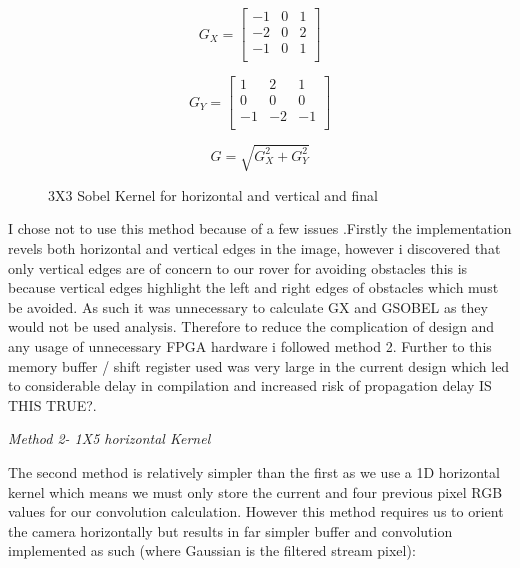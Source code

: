 \documentclass[10pt,twoside]{article}
\begin{document}
\begin{figure}[hbt]
    \begin{minipage}{.33\textwidth}
    \begin{equation}
    G_{X} =
        \begin{bmatrix}
        -1 & 0 & 1 \\ 
        -2 & 0 & 2 \\
        -1 & 0 & 1 \\
    \end{bmatrix}
    \end{equation}
    \end{minipage}
    \begin{minipage}{.33\textwidth}
    \begin{equation}
         G_{Y} =
        \begin{bmatrix}
        1 & 2 & 1 \\ 
        0 & 0 & 0 \\
        -1 & -2 & -1 \\
    \end{bmatrix}
    \end{equation}
    \end{minipage}
     \begin{minipage}{.33\textwidth}
    \begin{equation}
    G = \sqrt{G_{X}^2 + G_{Y}^2}
    \end{equation}
    \end{minipage}
    \caption{3X3 Sobel Kernel for horizontal and vertical and final}
\end{figure}

I chose not to use this method because of a few issues .Firstly the implementation revels both horizontal and vertical edges in the image, however i discovered that only vertical edges are of concern to our rover for avoiding obstacles this is because vertical edges highlight the left and right edges of obstacles which must be avoided. As such it was unnecessary to calculate GX and GSOBEL as they would not be used analysis. Therefore to reduce the complication of design and any usage of unnecessary FPGA hardware i followed method 2. Further to this memory buffer / shift register used was very large in the current design which led to considerable delay in compilation and increased risk of propagation delay IS THIS TRUE?. 

\newpage


\textit{Method 2- 1X5 horizontal Kernel}

The second method is relatively simpler than the first as we use  a 1D horizontal kernel which  means we must only store the current and four previous pixel RGB values for our convolution calculation. However this method requires us to orient the camera horizontally but results in far simpler buffer and convolution implemented as such (where Gaussian is the filtered stream pixel):
\end{document}
